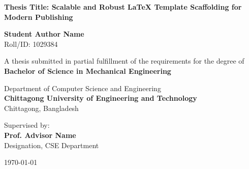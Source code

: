 \begin{titlepage}
\begin{center}
    \vspace*{1cm}
    
    
    \vspace{1.5cm}
    
    {\huge \bfseries \color{primary} Thesis Title: Scalable and Robust LaTeX Template Scaffolding for Modern Publishing}
    
    \vspace{1.5cm}
    
    {\Large \bfseries Student Author Name} \\
    \vspace{0.2cm}
    {Roll/ID: 1029384}
    
    \vspace{1.5cm}
    
    {A thesis submitted in partial fulfillment of the requirements for the degree of} \\
    \vspace{0.3cm}
    {\large \bfseries \color{secondary} Bachelor of Science in Mechanical Engineering}
    
    \vspace{1.5cm}
    
    {\large Department of Computer Science and Engineering} \\
    \vspace{0.2cm}
    {\large \bfseries \color{primary} Chittagong University of Engineering and Technology} \\
    \vspace{0.1cm}
    {Chittagong, Bangladesh}
    
    \vfill
    
    {Supervised by:} \\
    {\large \bfseries Prof. Advisor Name} \\
    {Designation, CSE Department}
    
    \vspace{1cm}
    
    {\large \today}
    
\end{center}
\end{titlepage}
